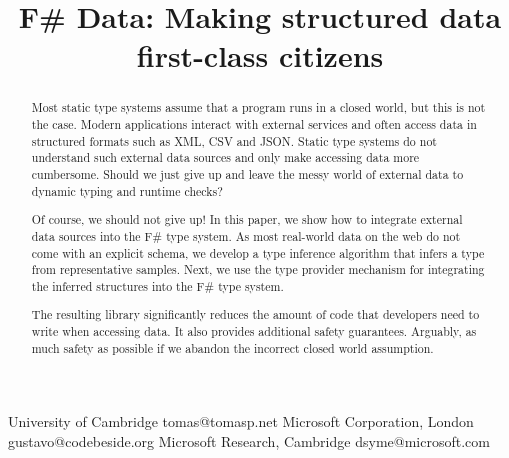 \documentclass[preprint]{sigplanconf}
\begin{document}
\setlength{\pdfpageheight}{\paperheight}
\setlength{\pdfpagewidth}{\paperwidth}


\title{F\# Data: \textnormal{Making structured data first-class citizens}}

           {University of Cambridge}
           {tomas@tomasp.net}
           {Microsoft Corporation, London}
           {gustavo@codebeside.org}
           {Microsoft Research, Cambridge}
           {dsyme@microsoft.com}
\maketitle


\begin{abstract}
Most static type systems assume that a program runs in a closed world, but this is not the 
case. Modern applications interact with external services and often access data in structured 
formats such as XML, CSV and JSON. Static type systems do not understand such external data sources
and only make accessing data more cumbersome. Should we just give up and leave the messy world of 
external data to dynamic typing and runtime checks?

Of course, we should not give up! In this paper, we show how to integrate external data sources 
into the F\# type system. As most real-world data on the web do not come with an explicit schema, 
we develop a type inference algorithm that infers a type from representative samples. Next, we use 
the type provider mechanism for integrating the inferred structures into the F\# type
system. 

The resulting library significantly reduces the amount of code that developers need to write when 
accessing data. It also provides additional safety guarantees. Arguably, as much safety as possible 
if we abandon the incorrect closed world assumption.
\end{abstract}
\end{document}
